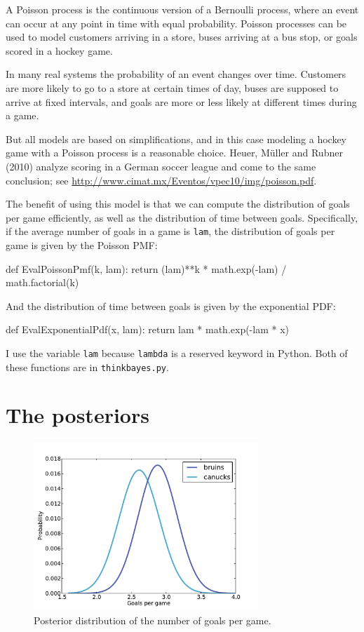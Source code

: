 \documentclass[12pt]{book}
\theoremstyle{exercise}
\begin{document}
A Poisson process is the continuous version of a Bernoulli process,
where an event can occur at any point in time with equal probability.
Poisson processes can be used to model customers arriving in a store,
buses arriving at a bus stop, or goals scored in a hockey game.

In many real systems the probability of an event changes over time.
Customers are more likely to go to a store at certain times of day,
buses are supposed to arrive at fixed intervals, and goals are more
or less likely at different times during a game.

But all models are based on simplifications, and in this case modeling
a hockey game with a Poisson process is a reasonable choice.  Heuer,
M\"{u}ller and Rubner (2010) analyze scoring in a German soccer league
and come to the same conclusion; see
\url{http://www.cimat.mx/Eventos/vpec10/img/poisson.pdf}.

The benefit of using this model is that we can compute the distribution
of goals per game efficiently, as well as the distribution of time
between goals.  Specifically, if the average number of goals
in a game is {\tt lam}, the distribution of goals per game is
given by the Poisson PMF:

\begin{code}
def EvalPoissonPmf(k, lam):
    return (lam)**k * math.exp(-lam) / math.factorial(k)
\end{code}  

And the distribution of time between goals is given by the
exponential PDF:

\begin{code}
def EvalExponentialPdf(x, lam):
    return lam * math.exp(-lam * x)
\end{code}  

I use the variable
{\tt lam} because {\tt lambda} is a reserved keyword in Python.
Both of these functions are in \verb"thinkbayes.py".


\section{The posteriors}

\begin{figure}
\centerline{\includegraphics[height=2.5in]{figs/hockey1.pdf}}
\caption{Posterior distribution of the number of
goals per game.}
\label{fig.hockey1}
\end{figure}
\end{document}
